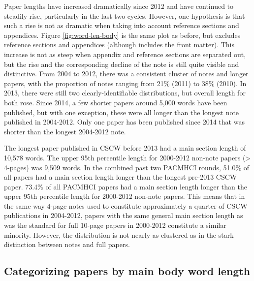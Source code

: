\documentclass[format=acmsmall, screen=true]{acmart}
\begin{document}
Paper lengths have increased dramatically since 2012 and have continued to steadily rise, particularly in the last two cycles. However, one hypothesis is that such a rise is not as dramatic when taking into account reference sections and appendices. Figure \ref{fig:word-len-body} is the same plot as before, but excludes reference sections and appendices (although includes the front matter). This increase is not as steep when appendix and reference sections are separated out, but the rise and the corresponding decline of the note is still quite visible and distinctive.  From 2004 to 2012, there was a consistent cluster of notes and longer papers, with the proportion of notes ranging from 21\% (2011) to 38\% (2010). In 2013, there were still two clearly-identifiable distributions, but overall length for both rose. Since 2014, a few shorter papers around 5,000 words have been published, but with one exception, these were all longer than the longest note published in 2004-2012. Only one paper has been published since 2014 that was shorter than the longest 2004-2012 note.

The longest paper published in CSCW before 2013 had a main section length of 10,578 words. The upper 95th percentile length for 2000-2012 non-note papers (> 4-pages) was 9,509 words. In the combined past two PACMHCI rounds, 51.0\% of all papers had a main section length longer than the longest pre-2013 CSCW paper. 73.4\% of all PACMHCI papers had a main section length longer than the upper 95th percentile length for 2000-2012 non-note papers. This means that in the same way 4-page notes used to constitute approximately a quarter of CSCW publications in 2004-2012, papers with the same general main section length as was the standard for full 10-page papers in 2000-2012 constitute a similar minority. However, the distribution is not nearly as clustered as in the stark distinction between notes and full papers.

\subsection{Categorizing papers by main body word length}
\end{document}
